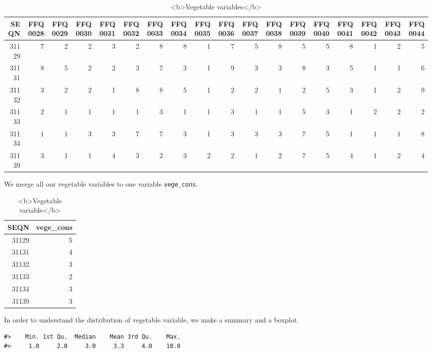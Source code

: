 \documentclass[
]{article}
\begin{document}
\begin{table}

\caption{\label{tab:unnamed-chunk-39}<b>Vegetable variables</b>}
\centering
\begin{tabular}[t]{r|r|r|r|r|r|r|r|r|r|r|r|r|r|r|r|r|r}
\hline
SEQN & FFQ0028 & FFQ0029 & FFQ0030 & FFQ0031 & FFQ0032 & FFQ0033 & FFQ0034 & FFQ0035 & FFQ0036 & FFQ0037 & FFQ0038 & FFQ0039 & FFQ0040 & FFQ0041 & FFQ0042 & FFQ0043 & FFQ0044\\
\hline
31129 & 7 & 2 & 2 & 3 & 2 & 8 & 8 & 1 & 7 & 5 & 8 & 5 & 5 & 8 & 1 & 2 & 5\\
\hline
31131 & 8 & 5 & 2 & 2 & 3 & 7 & 3 & 1 & 9 & 3 & 3 & 8 & 3 & 5 & 1 & 1 & 6\\
\hline
31132 & 3 & 2 & 2 & 1 & 8 & 8 & 5 & 1 & 2 & 2 & 1 & 2 & 5 & 3 & 1 & 2 & 9\\
\hline
31133 & 2 & 1 & 1 & 1 & 1 & 3 & 1 & 1 & 3 & 1 & 1 & 5 & 3 & 1 & 2 & 2 & 2\\
\hline
31134 & 1 & 1 & 3 & 3 & 7 & 7 & 3 & 1 & 3 & 3 & 3 & 7 & 5 & 1 & 1 & 1 & 8\\
\hline
31139 & 3 & 1 & 1 & 4 & 3 & 2 & 3 & 2 & 2 & 1 & 2 & 7 & 5 & 4 & 1 & 2 & 4\\
\hline
\end{tabular}
\end{table}

We merge all our vegetable variables to one variable
\texttt{vege\_cons}.

\begin{table}

\caption{\label{tab:unnamed-chunk-40}<b>Vegetable variable</b>}
\centering
\begin{tabular}[t]{r|r}
\hline
SEQN & vege\_cons\\
\hline
31129 & 5\\
\hline
31131 & 4\\
\hline
31132 & 3\\
\hline
31133 & 2\\
\hline
31134 & 3\\
\hline
31139 & 3\\
\hline
\end{tabular}
\end{table}

In order to understand the distribution of vegetable variable, we make a
summary and a boxplot.

\begin{verbatim}
#>    Min. 1st Qu.  Median    Mean 3rd Qu.    Max. 
#>     1.0     2.0     3.0     3.3     4.0    10.0
\end{verbatim}
\end{document}
